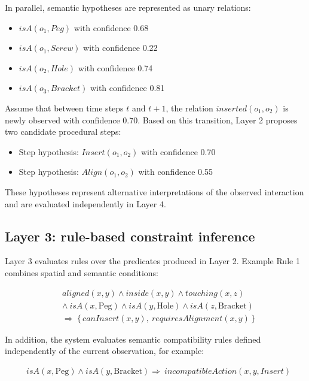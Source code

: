 \documentclass[11pt,titlepage,openright]{book}
\begin{document}
In parallel, semantic hypotheses are represented as unary relations:

\begin{itemize}
\item $isA(o_1, Peg)$ with confidence 0.68
\item $isA(o_1, Screw)$ with confidence 0.22
\item $isA(o_2, Hole)$ with confidence 0.74
\item $isA(o_3, Bracket)$ with confidence 0.81
\end{itemize}

Assume that between time steps $t$ and $t+1$, the relation $inserted(o_1, o_2)$ is newly observed with confidence 0.70. Based on this transition, Layer 2 proposes two candidate procedural steps:

\begin{itemize}
\item Step hypothesis: $Insert(o_1, o_2)$ with confidence 0.70
\item Step hypothesis: $Align(o_1, o_2)$ with confidence 0.55
\end{itemize}

These hypotheses represent alternative interpretations of the observed interaction and are evaluated independently in Layer 4.


\subsection{Layer 3: rule-based constraint inference}

Layer 3 evaluates rules over the predicates produced in Layer 2. Example Rule 1 combines spatial and semantic conditions:

\begin{align*}
&aligned(x,y) \land inside(x,y) \land touching(x,z) \\
&\land\ isA(x,\text{Peg}) \land isA(y,\text{Hole}) \land isA(z,\text{Bracket}) \\
&\Rightarrow\ \{\, canInsert(x,y),\ requiresAlignment(x,y) \,\}
\end{align*}


In addition, the system evaluates semantic compatibility rules defined independently of the current observation, for example:

\begin{align*}
&isA(x, \text{Peg}) \land isA(y, \text{Bracket}) \Rightarrow\  incompatibleAction(x, y, Insert)
\end{align*}
\end{document}
